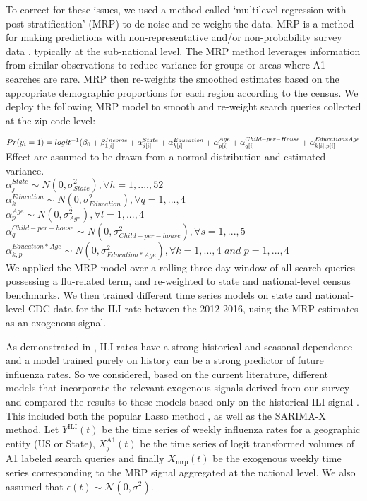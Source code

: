 \documentclass[fleqn,10pt]{wlscirep}
\begin{document}
To correct for these issues, we used a method called `multilevel regression with post-stratification' (MRP) to de-noise and re-weight the data. MRP is a method for making predictions with non-representative and/or non-probability survey data \cite{park_gelman_bafumi_2004}, typically at the sub-national level. The MRP method leverages information from similar observations to reduce variance for groups or areas where A1 searches are rare. MRP then re-weights the smoothed estimates based on the appropriate demographic proportions for each region according to the census. We deploy the following MRP model to smooth and re-weight search queries collected at the zip code level:

$Pr(y_i = 1) = logit^{-1}( \beta_0  + \beta_{1[i]}^{Income}
+ \alpha_{j[i]}^{State}  
+ \alpha_{k[i]}^{Education}  \\
+ \alpha_{p[i]}^{Age} 
+ \alpha_{q[i]}^{Child-per-House}
+ \alpha_{k[i],p[i]}^{Education*Age} $
\\

Effect are assumed to be drawn from a normal distribution and estimated variance. \\

\noindent
$\alpha_j^{State} \sim  N (0, \sigma_{State}^2), \forall h = 1, ...., 52  $ \\
$\alpha_k^{Education} \sim  N (0, \sigma_{Education}^2), \forall q = 1, ..., 4  $ \\
$\alpha_p^{Age} \sim  N (0, \sigma_{Age}^2), \forall l = 1, ..., 4 $ \\
$\alpha_q^{Child-per-house} \sim  N (0, \sigma_{Child-per-house}^2), \forall s = 1, ..., 5  $ \\
$\alpha_{k,p}^{Education*Age} \sim  N (0, \sigma_{Education*Age}^2), \forall k = 1, ..., 4 \textit{ and } p = 1,...,4  $ \\

We applied the MRP model over a rolling three-day window of all search queries possessing a flu-related term, and re-weighted to state and national-level census benchmarks. We then trained different time series models on state and national-level CDC data for the ILI rate between the 2012-2016, using the MRP estimates as an exogenous signal.

As demonstrated in \cite{lazer_etal_2014}, ILI rates have a strong historical and seasonal dependence and a model trained purely on history can be a strong predictor of future influenza rates. So we considered, based on the current literature, different models that incorporate the relevant exogenous signals derived from our survey and compared the results to these models based only on the historical ILI signal \cite{yang_etal_2015}. This included both the popular Lasso method \cite{yang_etal_2015}, as well as the SARIMA-X method. Let $Y^{\text{ILI}}(t)$ be the time series of weekly influenza rates for a geographic entity (US or State), $X_j^{\text{A1}}(t)$ be the time series of logit transformed volumes of A1 labeled search queries and finally $X_{\text{mrp}}(t)$ be the exogenous weekly time series corresponding to the MRP signal aggregated at the national level. We also assumed that $\epsilon(t) \sim \mathcal{N}(0,\sigma^2)$. 
\end{document}
